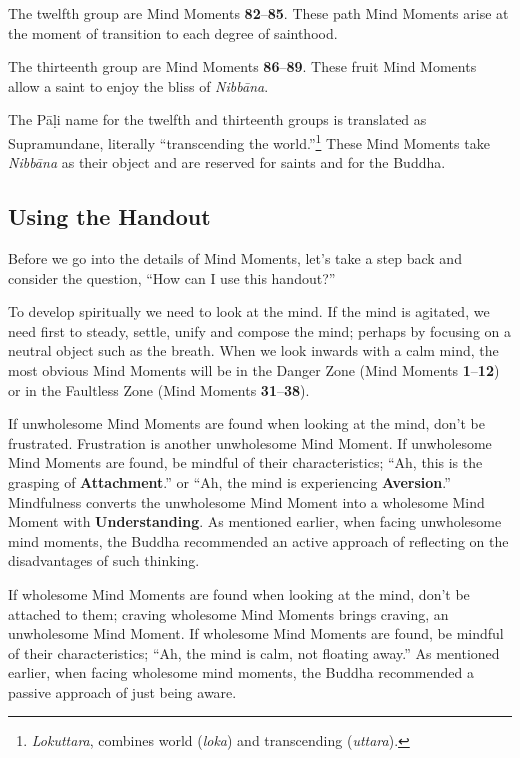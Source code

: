 The twelfth group are Mind Moments \textbf{82}--\textbf{85}. These path Mind Moments arise at the moment of transition to each degree of sainthood. 

The thirteenth group are Mind Moments \textbf{86}--\textbf{89}. These fruit Mind Moments allow a saint to enjoy the bliss of \textit{Nibbāna}. 

The Pāḷi name for the twelfth and thirteenth groups is translated as Supramundane, literally “transcending the world.”\footnote{\textit{Lokuttara}, combines world (\textit{loka}) and transcending (\textit{uttara}).} These Mind Moments take \textit{Nibbāna} as their object and are reserved for saints and for the Buddha.

\subsection*{Using the Handout}

Before we go into the details of Mind Moments, let’s take a step back and consider the question, “How can I use this handout?”

To develop spiritually we need to look at the mind. If the mind is agitated, we need first to steady, settle, unify and compose the mind; perhaps by focusing on a neutral object such as the breath. When we look inwards with a calm mind, the most obvious Mind Moments will be in the Danger Zone (Mind Moments \textbf{1}--\textbf{12}) or in the Faultless Zone (Mind Moments \textbf{31}--\textbf{38}).

If unwholesome Mind Moments are found when looking at the mind, don’t be frustrated. Frustration is another unwholesome Mind Moment. If unwholesome Mind Moments are found, be mindful of their characteristics; “Ah, this is the grasping of \textbf{Attachment}.” or “Ah, the mind is experiencing \textbf{Aversion}.” Mindfulness converts the unwholesome Mind Moment into a wholesome Mind Moment with \textbf{Understanding}. As mentioned earlier, when facing unwholesome mind moments, the Buddha recommended an active approach of reflecting on the disadvantages of such thinking.

If wholesome Mind Moments are found when looking at the mind, don’t be attached to them; craving wholesome Mind Moments brings craving, an unwholesome Mind Moment. If wholesome Mind Moments are found, be mindful of their characteristics; “Ah, the mind is calm, not floating away.” As mentioned earlier, when facing wholesome mind moments, the Buddha recommended a passive approach of just being aware.

